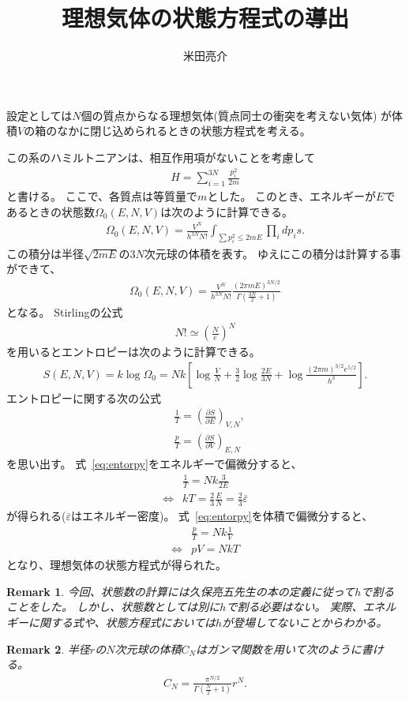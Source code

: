 \documentclass{jsarticle}
\newtheorem{remark}{Remark}
\begin{document}
\title{理想気体の状態方程式の導出}
\author{米田亮介}
\maketitle	

設定としては$N$個の質点からなる理想気体(質点同士の衝突を考えない気体)
が体積$V$の箱のなかに閉じ込められるときの状態方程式を考える。

この系のハミルトニアンは、相互作用項がないことを考慮して
\begin{align}
H=\sum_{i=1}^{3N}\frac{p_{i}^{2}}{2m}
\end{align}
と書ける。
ここで、各質点は等質量で$m$とした。
このとき、エネルギーが$E$であるときの状態数$\Omega_{0}(E,N,V)$は次のように計算できる。
\begin{align}
\Omega_{0}(E,N,V)=\frac{V^{N}}{h^{3N}N!}\int_{\sum p_{i}^{2}\leq2mE}\prod_{i} dp_{i}s.
\end{align}
この積分は半径$\sqrt{2mE}$の$3N$次元球の体積を表す。
ゆえにこの積分は計算する事ができて、
\begin{align}
\Omega_{0}(E,N,V)=\frac{V^{N}}{h^{3N}N!}\frac{(2\pi mE)^{3N/2}}{\Gamma\left(\frac{3N}{2}+1\right)}
\end{align}
となる。
Stirlingの公式
\begin{align}
N!\simeq\left(\frac{N}{e}\right)^{N}
\end{align}
を用いるとエントロピーは次のように計算できる。
\begin{align}
S(E,N,V)=k\log\Omega_{0}=Nk\left[\log\frac{V}{N}+\frac{3}{2}\log\frac{2E}{3N}
+\log\frac{(2\pi m)^{3/2}e^{5/2}}{h^{3}}\right].
\label{eq:entorpy}
\end{align}
エントロピーに関する次の公式
\begin{align}
&\frac{1}{T}=\left(\frac{\partial S}{\partial E}\right)_{V,N},\\
&\frac{p}{T}=\left(\frac{\partial S}{\partial V}\right)_{E,N}
\end{align}
を思い出す。
式~\eqref{eq:entorpy}をエネルギーで偏微分すると、
\begin{align}
&\frac{1}{T}=Nk\frac{3}{2E}\\
\Longleftrightarrow&kT=\frac{2}{3}\frac{E}{N}=\frac{2}{3}\overline{\varepsilon}
\end{align}
が得られる($\overline{\varepsilon}$はエネルギー密度)。
式~\eqref{eq:entorpy}を体積で偏微分すると、
\begin{align}
&\frac{p}{T}=Nk\frac{1}{V}\\
\Longleftrightarrow&pV=NkT
\end{align}
となり、理想気体の状態方程式が得られた。

\begin{remark}
今回、状態数の計算には久保亮五先生の本の定義に従って$h$で割ることをした。
しかし、状態数としては別に$h$で割る必要はない。
実際、エネルギーに関する式や、状態方程式においては$h$が登場してないことからわかる。	
\end{remark}

\begin{remark}
半径$r$の$N$次元球の体積$C_{N}$はガンマ関数を用いて次のように書ける。
\begin{align}
C_{N}=\frac{\pi^{N/2}}{\Gamma\left(\frac{N}{2}+1\right)}r^{N}.
\end{align}
\end{remark}
\end{document}
